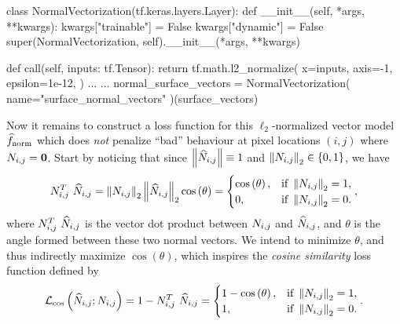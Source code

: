 \begin{listing}[H]
  \label{code:l2-normalization}
  \begin{pythoncode}
  class NormalVectorization(tf.keras.layers.Layer):
    def __init__(self, *args, **kwargs):
        kwargs["trainable"] = False
        kwargs["dynamic"] = False
        super(NormalVectorization, self).__init__(*args, **kwargs)

    def call(self, inputs: tf.Tensor):
        return tf.math.l2_normalize(
            x=inputs,
            axis=-1,
            epsilon=1e-12,
        )
  ...
  ...
  normal_surface_vectors = NormalVectorization(
      name="surface_normal_vectors"
  )(surface_vectors)
  \end{pythoncode}
\end{listing}
\noindent
Now it remains to construct a loss function for this $\ell_2$-normalized vector model $\widehat{f}_{\mathrm{norm}}$ which does \emph{not} penalize \enquote{bad} behaviour at pixel locations $(i,j)$ where $N_{i,j} = \boldsymbol{0}$.
Start by noticing that since $\left\lVert\widehat{N}_{i,j}\right\rVert \equiv 1$ and $\left\lVert N_{i,j}\right\rVert_2 \in \{0,1\}$, we have
%
\begin{equation*}
  N_{i,j}^T~\widehat{N}_{i,j}
  =
  \left\lVert N_{i,j}\right\rVert_2
  \left\lVert\widehat{N}_{i,j}\right\rVert_2
  \cos\left(\theta\right)
  =
  \begin{cases}
    \cos\left(\theta\right), &\text{if }\left\lVert N_{i,j}\right\rVert_2 = 1,\\
    0, &\text{if } \left\lVert N_{i,j}\right\rVert_2 = 0.\\
  \end{cases},
\end{equation*}
%
where $N_{i,j}^T~\widehat{N}_{i,j}$ is the vector dot product between $N_{i,j}$ and $\widehat{N}_{i,j}$, and $\theta$ is the angle formed between these two normal vectors.
We intend to minimize $\theta$, and thus indirectly maximize $\cos(\theta)$, which inspires the \textit{cosine similarity} loss function defined by
%
\begin{equation*}
  \mathcal{L}_{\cos}\left(\widehat{N}_{i,j}; N_{i,j}\right)
  =
  1 - N_{i,j}^T~\widehat{N}_{i,j}
  =
  \begin{cases}
    1 - \cos\left(\theta\right), &\text{if }\left\lVert N_{i,j}\right\rVert_2 = 1,\\
    1, &\text{if } \left\lVert N_{i,j}\right\rVert_2 = 0.\\
  \end{cases}.
\end{equation*}
